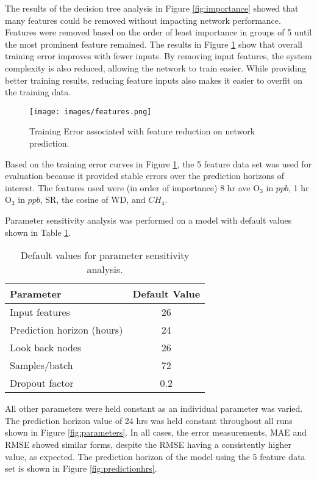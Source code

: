 The results of the decision tree analysis in Figure \ref{fig:importance} showed that many features could be removed without impacting network performance. Features were removed based on the order of least importance in groups of 5 until the most prominent feature remained. The results in Figure \ref{fig:features} show that overall training error improves with fewer inputs. By removing input features, the system complexity is also reduced, allowing the network to train easier. While providing better training results, reducing feature inputs also makes it easier to overfit on the training data.
%
\begin{figure}[H]
\centering
\texttt{[image: images/features.png]}
\caption{Training Error associated with feature reduction on network prediction.}
\label{fig:features}
\end{figure}
%
Based on the training error curves in Figure \ref{fig:features}, the 5 feature data set was used for evaluation because it provided stable errors over the prediction horizons of interest. The features used were (in order of importance) 8 hr ave O$_{3}$ in $ppb$, 1 hr O$_{3}$ in $ppb$, SR, the cosine of WD, and $CH_{4}$.

Parameter sensitivity analysis was performed on a model with default values shown in Table \ref{tb:default-parameter}.
%

\begin{table}[H]
\centering
\caption{Default values for parameter sensitivity analysis.}
\label{tb:default-parameter}
\begin{tabular}{@{}lc@{}}
\toprule
\textbf{Parameter} & \textbf{Default Value} \\ \midrule
Input features & 26 \\
Prediction horizon (hours) & 24 \\
Look back nodes & 26 \\
Samples/batch & 72 \\
Dropout factor & 0.2 \\ \bottomrule
\end{tabular}
\end{table}
%
All other parameters were held constant as an individual parameter was varied. The prediction horizon value of 24 hrs was held constant throughout all runs shown in  Figure \ref{fig:parameters}. In all cases, the error measurements, MAE and RMSE showed similar forms, despite the RMSE having a consistently higher value, as expected. The prediction horizon of the model using the 5 feature data set is shown in Figure \ref{fig:predictionhrs}.

